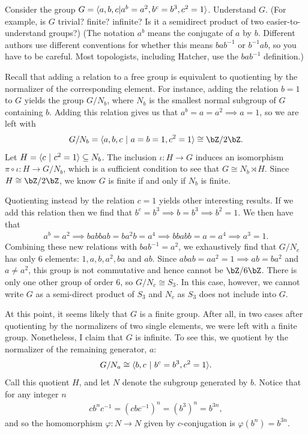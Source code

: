 \begin{homework}[e]
	\prob Consider the group $G=\langle a,b,c|a^b=a^2, b^c=b^3, c^2=1\rangle$. Understand $G$.  (For example, is $G$ trivial?  finite?  infinite? Is it a semidirect product of two easier-to-understand groups?) (The notation $a^b$ means the conjugate of $a$ by $b$.  Different authors use different conventions for whether this means $bab^{-1}$ or $b^{-1}ab$, so you have to be careful.  Most topologists, including Hatcher, use the $bab^{-1}$ definition.)
	\begin{prf}
		Recall that adding a relation to a free group is equivalent to quotienting by the normalizer of the corresponding element. For instance, adding the relation $b = 1$ to $G$ yields the group $G/N_b$, where $N_b$ is the smallest normal subgroup of $G$ containing $b$. Adding this relation gives us that $a^b = a = a^2 \implies a = 1$, so we are left with
		\begin{align*}
			G/N_b = \gend{a,b,c ~|~ a = b = 1, c^2 = 1} \cong \bZ/2\bZ.
		\end{align*}
		Let $H = \langle c ~|~ c^2 = 1\rangle \subseteq N_b$. The inclusion $\iota:H\to G$ induces an isomorphism $\pi\circ \iota: H \to G/N_b$, which is a sufficient condition to see that $G \cong N_b \rtimes H$. Since $H \cong \bZ/2\bZ$, we know $G$ is finite if and only if $N_b$ is finite.

		Quotienting instead by the relation $c = 1$ yields other interesting results. If we add this relation then we find that $b^c = b^3 \implies b = b^3 \implies b^2 = 1$. We then have that
		\begin{align*}
			a^b = a^2 \implies babbab = ba^2b = a^4 \implies bbabb = a = a^4 \implies a^3 = 1.
		\end{align*}
		Combining these new relations with $bab^{-1} = a^2$, we exhaustively find that $G/N_c$ has only $6$ elements: $1, a, b, a^2, ba$ and $ab$. Since $abab = a a^2 = 1\implies ab = ba^2$ and $a\neq a^2$, this group is not commutative and hence cannot be $\bZ/6\bZ$. There is only one other group of order 6, so $G/N_c \cong S_3$. In this case, however, we cannot write $G$ as a semi-direct product of $S_3$ and $N_c$ as $S_3$ does not include into $G$.

		At this point, it seems likely that $G$ is a finite group. After all, in two cases after quotienting by the normalizers of two single elements, we were left with a finite group. Nonetheless, I claim that $G$ is infinite. To see this, we quotient by the normalizer of the remaining generator, $a$:
		\begin{align*}
			G/N_a \cong \langle b,c ~|~ b^c = b^3, c^2 = 1\rangle.
		\end{align*}
		Call this quotient $H$, and let $N$ denote the subgroup generated by $b$. Notice that for any integer $n$
		\begin{align*}
			cb^nc^{-1} = (cbc^{-1})^n = (b^3)^n = b^{3n},
		\end{align*}
		and so the homomorphism $\varphi:N\to N$ given by $c$-conjugation is $\varphi(b^n) = b^{3n}$.


\end{prf}
\end{homework}
